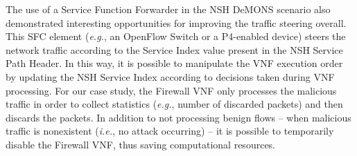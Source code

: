 The use of a Service Function Forwarder in the NSH DeMONS scenario also demonstrated interesting opportunities for improving the traffic steering overall. This SFC element (\textit{e.g.}, an OpenFlow Switch or a P4-enabled device) steers the network traffic according to the Service Index value present in the NSH Service Path Header. In this way, it is possible to manipulate the VNF execution order by updating the NSH Service Index according to decisions taken during VNF processing. For our case study, the Firewall VNF only processes the malicious traffic in order to collect statistics (\textit{e.g.}, number of discarded packets) and then discards the packets. In addition to not processing benign flows -- when malicious traffic is nonexistent (\textit{i.e.}, no attack occurring) -- it is possible to temporarily disable the Firewall VNF, thus saving computational resources.



